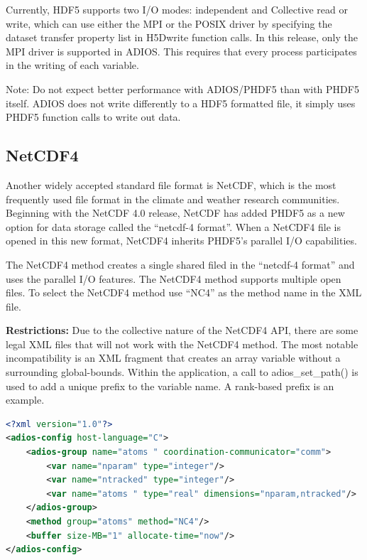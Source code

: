 Currently, HDF5 supports two I/O modes: independent and Collective read or write, 
which can use either the MPI or the POSIX driver by specifying the dataset transfer 
property list in H5Dwrite function calls. In this release, only the MPI driver 
is supported in ADIOS.
This requires that every process participates in the writing of each variable. 

Note: Do not expect better performance with ADIOS/PHDF5 than with PHDF5 itself. ADIOS does not write differently to a HDF5 formatted file, it simply uses PHDF5 function calls to write out data. 


\subsection{NetCDF4}

Another widely accepted standard file format is NetCDF, which is the most frequently 
used file format in the climate and weather research communities.  Beginning with 
the NetCDF 4.0 release, NetCDF has added PHDF5 as a new option for data storage 
called the ``netcdf-4 format''.  When a NetCDF4 file is opened in this new format, 
NetCDF4 inherits PHDF5's parallel I/O capabilities.

The NetCDF4 method creates a single shared filed in the ``netcdf-4 format'' and 
uses the parallel I/O features.  The NetCDF4 method supports multiple open files. 
 To select the NetCDF4 method use ``NC4'' as the method name in the XML file.

\textbf{Restrictions:} Due to the collective nature of the NetCDF4 API, there are 
some legal XML files that will not work with the NetCDF4 method.  The most notable 
incompatibility is an XML fragment that creates an array variable without a surrounding 
global-bounds.  Within the application, a call to adios\_set\_path() is used to 
add a unique prefix to the variable name.  A rank-based prefix is an example. 

\begin{lstlisting}[language=XML, caption=Example XML]
<?xml version="1.0"?> 
<adios-config host-language="C">
	<adios-group name="atoms " coordination-communicator="comm"> 
		<var name="nparam" type="integer"/>
		<var name="ntracked" type="integer"/>
		<var name="atoms " type="real" dimensions="nparam,ntracked"/> 
	</adios-group>
	<method group="atoms" method="NC4"/> 
	<buffer size-MB="1" allocate-time="now"/> 
</adios-config>
\end{lstlisting}

